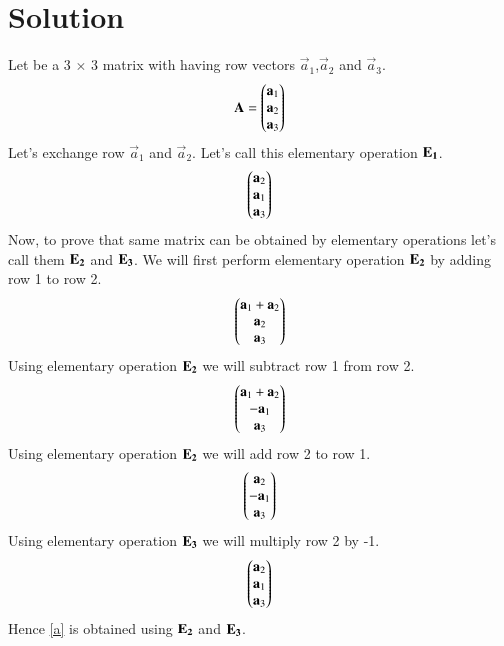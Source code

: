 \documentclass[journal,12pt,twocolumn]{IEEEtran}
\begin{document}
 \section{\textbf{Solution}}
 Let  be a 3 $\times$ 3 matrix with having row vectors $\vec{a}_1$,$\vec{a}_2$ and $\vec{a}_3$.
 \begin{align}
 \mathbf{A}=\begin{pmatrix}\mathbf{a}_{1}\\\mathbf{a}_{2}\\\mathbf{a}_{3}\end{pmatrix}
   \end{align}
  Let's exchange row $\vec{a}_1$ and $\vec{a}_2$. Let's call this elementary operation $\bf{E}_1$.
  \begin{align}
\begin{pmatrix}\mathbf{a}_2\\\mathbf{a}_1\\\mathbf{a}_3\end{pmatrix}\label{a}
  \end{align}
  Now, to prove that same matrix can be obtained by elementary operations let's call them $\bf{E}_2$ and $\bf{E}_3$. We will first perform elementary operation $\bf{E}_2$ by adding row 1 to row 2.
  \begin{align}
  \begin{pmatrix}\mathbf{a}_1+\mathbf{a}_2\\\mathbf{a}_2\\\mathbf{a}_3\end{pmatrix}
  \end{align}
  Using elementary operation $\bf{E}_2$ we will subtract row 1 from row 2.
  \begin{align}
  \begin{pmatrix}\mathbf{a}_1+\mathbf{a}_2\\-\mathbf{a}_1\\\mathbf{a}_3\end{pmatrix}
  \end{align}
  Using elementary operation $\bf{E}_2$ we will add row 2 to row 1.
   \begin{align}
  \begin{pmatrix}\mathbf{a}_2\\-\mathbf{a}_1\\\mathbf{a}_3\end{pmatrix}
  \end{align}
  Using elementary operation $\bf{E}_3$ we will multiply row 2 by -1.
   \begin{align}
  \begin{pmatrix}\mathbf{a}_2\\\mathbf{a}_1\\\mathbf{a}_3\end{pmatrix}
  \end{align}
  Hence \eqref{a} is obtained using $\bf{E}_2$ and $\bf{E}_3$.
\end{document}
